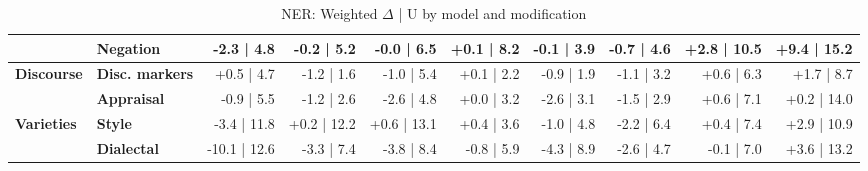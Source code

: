 \begin{table}[h]
{\begin{tabular}{llrrrrrrrr}
  & \textbf{Negation} & -2.3 | 4.8 & -0.2 | 5.2 & -0.0 | 6.5 & +0.1 | 8.2 & -0.1 | 3.9 & -0.7 | 4.6 & +2.8 | 10.5 & +9.4 | 15.2 \\
\midrule
\textbf{Discourse} & \textbf{Disc. markers} & +0.5 | 4.7 & -1.2 | 1.6 & -1.0 | 5.4 & +0.1 | 2.2 & -0.9 | 1.9 & -1.1 | 3.2 & +0.6 | 6.3 & +1.7 | 8.7 \\
  & \textbf{Appraisal} & -0.9 | 5.5 & -1.2 | 2.6 & -2.6 | 4.8 & +0.0 | 3.2 & -2.6 | 3.1 & -1.5 | 2.9 & +0.6 | 7.1 & +0.2 | 14.0 \\
\midrule
\textbf{Varieties} & \textbf{Style} & -3.4 | 11.8 & +0.2 | 12.2 & +0.6 | 13.1 & +0.4 | 3.6 & -1.0 | 4.8 & -2.2 | 6.4 & +0.4 | 7.4 & +2.9 | 10.9 \\
  & \textbf{Dialectal} & -10.1 | 12.6 & -3.3 | 7.4 & -3.8 | 8.4 & -0.8 | 5.9 & -4.3 | 8.9 & -2.6 | 4.7 & -0.1 | 7.0 & +3.6 | 13.2 \\
\bottomrule
\end{tabular}}
\caption{NER: Weighted $\Delta$ | U by model and modification}\label{tab:ner_combined}
\end{table}